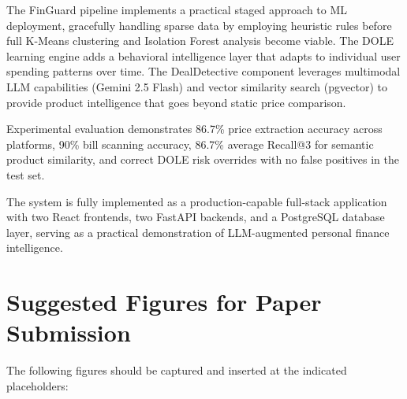 \documentclass[]{IEEEtran}
\begin{document}
The FinGuard pipeline implements a practical staged approach to ML deployment, gracefully handling sparse data by employing heuristic rules before full K-Means clustering and Isolation Forest analysis become viable. The DOLE learning engine adds a behavioral intelligence layer that adapts to individual user spending patterns over time. The DealDetective component leverages multimodal LLM capabilities (Gemini 2.5 Flash) and vector similarity search (pgvector) to provide product intelligence that goes beyond static price comparison.

Experimental evaluation demonstrates 86.7\% price extraction accuracy across platforms, 90\% bill scanning accuracy, 86.7\% average Recall@3 for semantic product similarity, and correct DOLE risk overrides with no false positives in the test set.

The system is fully implemented as a production-capable full-stack application with two React frontends, two FastAPI backends, and a PostgreSQL database layer, serving as a practical demonstration of LLM-augmented personal finance intelligence.

\appendix
\section{Suggested Figures for Paper Submission}
\label{app:figures}

The following figures should be captured and inserted at the indicated placeholders:
\end{document}
